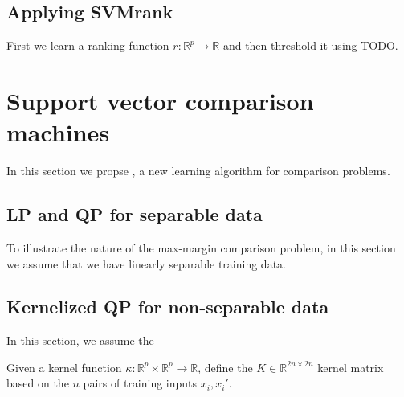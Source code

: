\documentclass{article}
\newcommand{\RR}{\mathbb R}
\begin{document}
\subsection{Applying SVMrank}

First we learn a ranking function $r:\RR^p \rightarrow \RR$ and then
threshold it using TODO.

\section{Support vector comparison machines}

In this section we propse , a new learning algorithm for
comparison problems.

\subsection{LP and QP for separable data}
\label{sec:lp-qp}

To illustrate the nature of the max-margin comparison problem, in this
section we assume that we have linearly separable training data.

\subsection{Kernelized QP for non-separable data}
\label{sec:svm-compare}

In this section, we assume the 

Given a kernel function $\kappa:\RR^p\times \RR^p\rightarrow\RR$,
define the $K\in\RR^{2n\times 2n}$ kernel matrix based on the $n$
pairs of training inputs $x_i,x_i'$.
\end{document}
